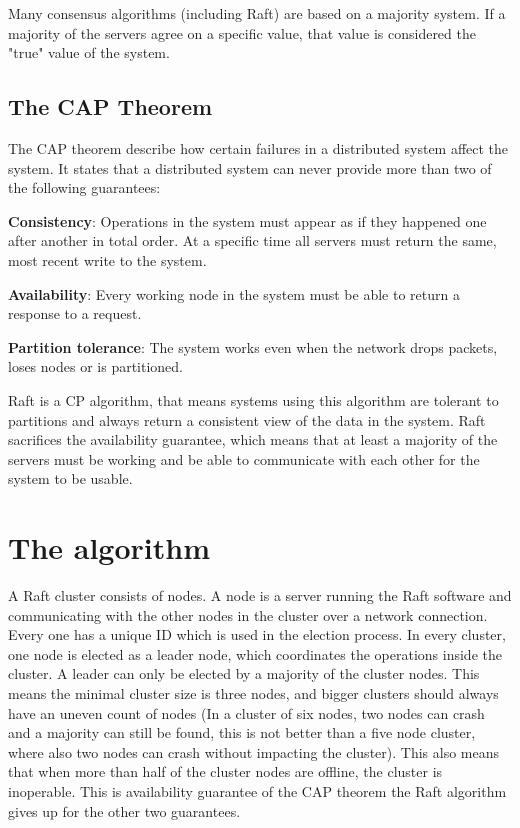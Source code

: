 Many consensus algorithms (including Raft) are based on a majority system. If a majority of the servers agree on a specific value, that value is considered the "true" value of the system.

\subsection{The CAP Theorem}
The CAP theorem describe how certain failures in a distributed system affect the system. It states that a distributed system can never provide more than two of the following guarantees: \cite{cap_theorem}

\textbf{Consistency}: Operations in the system must appear as if they happened one after another in total order. At a specific time all servers must return the same, most recent write to the system.

\textbf{Availability}: Every working node in the system must be able to return a response to a request.

\textbf{Partition tolerance}: The system works even when the network drops packets, loses nodes or is partitioned.

Raft is a CP algorithm, that means systems using this algorithm are tolerant to partitions and always return a consistent view of the data in the system. Raft sacrifices the availability guarantee, which means that at least a majority of the servers must be working and be able to communicate with each other for the system to be usable.

\section{The algorithm}
A Raft cluster consists of nodes. A node is a server running the Raft software and communicating with the other nodes in the cluster over a network connection.
Every one has a unique ID which is used in the election process. In every cluster, one node is elected as a leader node, which coordinates the operations inside the cluster. A leader can only be elected by
a majority of the cluster nodes. This means the minimal cluster size is three nodes, and bigger clusters should always have an uneven count of nodes (In a cluster
of six nodes, two nodes can crash and a majority can still be found, this is not better than a five node cluster, where also two nodes can crash without impacting the cluster).
This also means that when more than half of the cluster nodes are offline, the cluster is inoperable.
This is availability guarantee of the CAP theorem the Raft algorithm gives up for the other two guarantees. 

